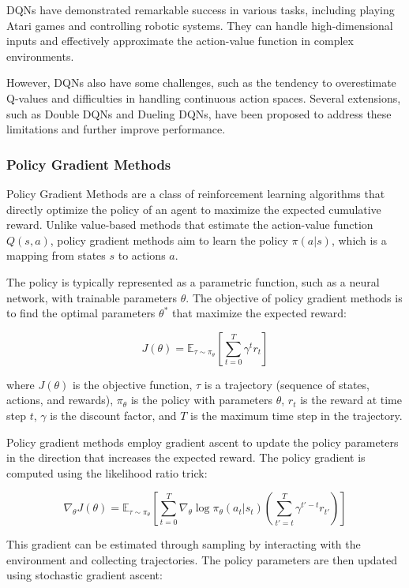 DQNs have demonstrated remarkable success in various tasks, including playing Atari games and controlling robotic systems. They can handle high-dimensional inputs and effectively approximate the action-value function in complex environments.

However, DQNs also have some challenges, such as the tendency to overestimate Q-values and difficulties in handling continuous action spaces. Several extensions, such as Double DQNs and Dueling DQNs, have been proposed to address these limitations and further improve performance.

\subsubsection{Policy Gradient Methods}
Policy Gradient Methods are a class of reinforcement learning algorithms that directly optimize the policy of an agent to maximize the expected cumulative reward. Unlike value-based methods that estimate the action-value function \(Q(s, a)\), policy gradient methods aim to learn the policy \(\pi(a|s)\), which is a mapping from states \(s\) to actions \(a\).

The policy is typically represented as a parametric function, such as a neural network, with trainable parameters \(\theta\). The objective of policy gradient methods is to find the optimal parameters \(\theta^*\) that maximize the expected reward:

\[J(\theta) = \mathbb{E}_{\tau \sim \pi_{\theta}} \left[ \sum_{t=0}^{T} \gamma^t r_t \right]\]

where \(J(\theta)\) is the objective function, \(\tau\) is a trajectory (sequence of states, actions, and rewards), \(\pi_{\theta}\) is the policy with parameters \(\theta\), \(r_t\) is the reward at time step \(t\), \(\gamma\) is the discount factor, and \(T\) is the maximum time step in the trajectory.

Policy gradient methods employ gradient ascent to update the policy parameters in the direction that increases the expected reward. The policy gradient is computed using the likelihood ratio trick:

\[\nabla_{\theta} J(\theta) = \mathbb{E}_{\tau \sim \pi_{\theta}} \left[ \sum_{t=0}^{T} \nabla_{\theta} \log \pi_{\theta}(a_t|s_t) \left( \sum_{t'=t}^{T} \gamma^{t'-t} r_{t'} \right) \right]\]

This gradient can be estimated through sampling by interacting with the environment and collecting trajectories.
The policy parameters are then updated using stochastic gradient ascent:

